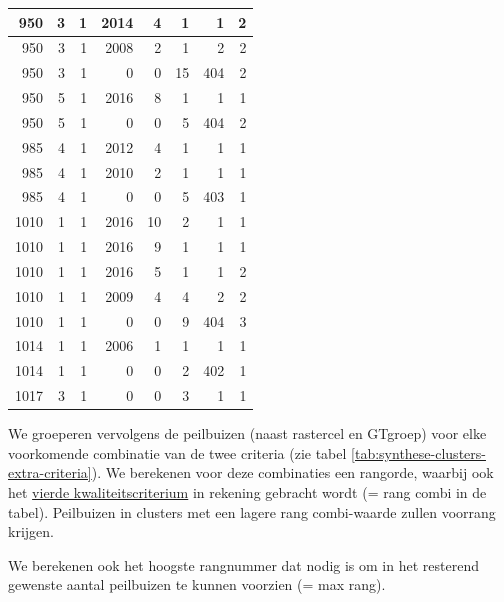 \documentclass[11pt,]{book}
\begin{document}
\begin{table}
\begin{tabular}[t]{r|r|r|r|r|r|r|r}
950 & 3 & 1 & 2014 & 4 & 1 & 1 & 2\\
\hline
950 & 3 & 1 & 2008 & 2 & 1 & 2 & 2\\
\hline
950 & 3 & 1 & 0 & 0 & 15 & 404 & 2\\
\hline
950 & 5 & 1 & 2016 & 8 & 1 & 1 & 1\\
\hline
950 & 5 & 1 & 0 & 0 & 5 & 404 & 2\\
\hline
985 & 4 & 1 & 2012 & 4 & 1 & 1 & 1\\
\hline
985 & 4 & 1 & 2010 & 2 & 1 & 1 & 1\\
\hline
985 & 4 & 1 & 0 & 0 & 5 & 403 & 1\\
\hline
1010 & 1 & 1 & 2016 & 10 & 2 & 1 & 1\\
\hline
1010 & 1 & 1 & 2016 & 9 & 1 & 1 & 1\\
\hline
1010 & 1 & 1 & 2016 & 5 & 1 & 1 & 2\\
\hline
1010 & 1 & 1 & 2009 & 4 & 4 & 2 & 2\\
\hline
1010 & 1 & 1 & 0 & 0 & 9 & 404 & 3\\
\hline
1014 & 1 & 1 & 2006 & 1 & 1 & 1 & 1\\
\hline
1014 & 1 & 1 & 0 & 0 & 2 & 402 & 1\\
\hline
1017 & 3 & 1 & 0 & 0 & 3 & 1 & 1\\
\hline
\end{tabular}
\end{table}

We groeperen vervolgens de peilbuizen (naast rastercel en GTgroep) voor
elke voorkomende combinatie van de twee criteria (zie tabel
\ref{tab:synthese-clusters-extra-criteria}). We berekenen voor deze
combinaties een rangorde, waarbij ook het
\protect\hyperlink{suppl-criteria}{vierde kwaliteitscriterium} in
rekening gebracht wordt (= rang combi in de tabel). Peilbuizen in
clusters met een lagere rang combi-waarde zullen voorrang krijgen.

We berekenen ook het hoogste rangnummer dat nodig is om in het resterend
gewenste aantal peilbuizen te kunnen voorzien (= max rang).
\end{document}
